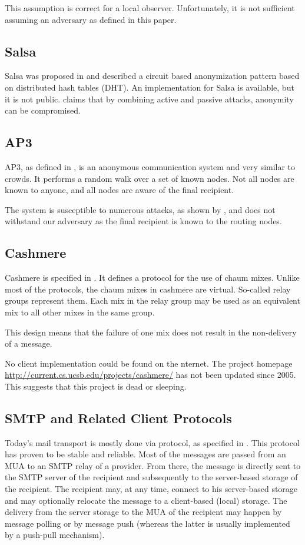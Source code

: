 This assumption is correct for a local observer. Unfortunately, it is not sufficient assuming an adversary as defined in this paper.

\subsection{Salsa}
Salsa was proposed in \cite{Salsa} and described a circuit based anonymization pattern based on distributed hash tables (DHT). An implementation for Salsa is available, but it is not public. \cite{ccs2008:mittal} claims that by combining active and passive attacks, anonymity can be compromised.

\subsection{AP3}
AP3, as defined in \cite{mislove2004ap3}, is an anonymous communication system and very similar to crowds. It performs a random walk over a set of known nodes. Not all nodes are known to anyone, and all nodes are aware of the final recipient. 

The system is susceptible to numerous attacks, as shown by \cite{ccs2008:mittal}, and does not withstand our adversary as the final recipient is known to the routing nodes.

\subsection{Cashmere}
Cashmere is specified in \cite{zhuang2005cashmere}. It defines a protocol for the use of chaum mixes. Unlike most of the protocols, the chaum mixes in cashmere are virtual. So-called relay groups represent them. Each mix in the relay group may be used as an equivalent mix to all other mixes in the same group. 

This design means that the failure of one mix does not result in the non-delivery of a message.

No client implementation could be found on the \textit{}nternet. The project homepage \href{http://current.cs.ucsb.edu/projects/cashmere/}{http://current.cs.ucsb.edu/projects/cashmere/} has not been updated since 2005. This suggests that this project is dead or sleeping.

\subsection{SMTP and Related Client Protocols\label{sec:mailTransport}}
Today's mail transport is mostly done via  protocol, as specified in \cite{RFC5321}. This protocol has proven to be stable and reliable. Most of the messages are passed from an MUA to an SMTP relay of a provider. From there, the message is directly sent to the SMTP server of the recipient and subsequently to the server-based storage of the recipient. The recipient may, at any time, connect to his server-based storage and may optionally relocate the message to a client-based (local) storage. The delivery from the server storage to the MUA of the recipient may happen by message polling or by message push (whereas the latter is usually implemented by a push-pull mechanism).

